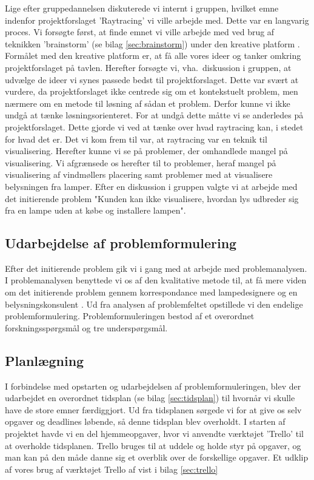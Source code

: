 \documentclass[oneside,a4paper,titlepage]{article}
\begin{document}
Lige efter gruppedannelsen diskuterede vi internt i gruppen, hvilket emne indenfor projektforslaget 'Raytracing' vi ville arbejde med. Dette var en langvarig proces. Vi forsøgte først, at finde emnet vi ville arbejde med ved brug af teknikken 'brainstorm' (se bilag \ref{sec:brainstorm}) under den kreative platform \cite{kreativ_platform}. Formålet med den kreative platform er, at få alle vores ideer og tanker omkring projektforslaget på tavlen. Herefter forsøgte vi, vha.\ diskussion i gruppen, at udvælge de ideer vi synes passede bedst til projektforslaget. Dette var svært at vurdere, da projektforslaget ikke centrede sig om et kontekstuelt problem, men nærmere om en metode til løsning af sådan et problem. Derfor kunne vi ikke undgå at tænke løsningsorienteret. For at undgå dette måtte vi se anderledes på projektforslaget. Dette gjorde vi ved at tænke over hvad raytracing kan, i stedet for hvad det er. Det vi kom frem til var, at raytracing var en teknik til visualisering. Herefter kunne vi se på problemer, der omhandlede mangel på visualisering. Vi afgrænsede os herefter til to problemer, heraf mangel på visualisering af vindmøllers placering samt problemer med at visualisere belysningen fra lamper. Efter en diskussion i gruppen valgte vi at arbejde med det initierende problem "Kunden kan ikke visualisere, hvordan lys udbreder sig fra en lampe uden at købe og installere lampen". 

\subsection{Udarbejdelse af problemformulering}
Efter det initierende problem gik vi i gang med at arbejde med problemanalysen. I problemanalysen benyttede vi os af den kvalitative metode til, at få mere viden om det initierende problem gennem korrespondance med lampedesignere og en belysningskonsulent \cite{kvalitativ_metode}. Ud fra analysen af problemfeltet opstillede vi den endelige problemformulering. Problemformuleringen bestod af et overordnet forskningsspørgsmål og tre underspørgsmål.

\subsection{Planlægning}
I forbindelse med opstarten og udarbejdelsen af problemformuleringen, blev der udarbejdet en overordnet tidsplan (se bilag \ref{sec:tidsplan}) til hvornår vi skulle have de store emner færdiggjort. Ud fra tidsplanen sørgede vi for at give os selv opgaver og deadlines løbende, så denne tidsplan blev overholdt. I starten af projektet havde vi en del hjemmeopgaver, hvor vi anvendte værktøjet 'Trello' til at overholde tidsplanen. Trello bruges til at uddele og holde styr på opgaver, og man kan på den måde danne sig et overblik over de forskellige opgaver. Et udklip af vores brug af værktøjet Trello af vist i bilag \ref{sec:trello}
\newline
\end{document}
